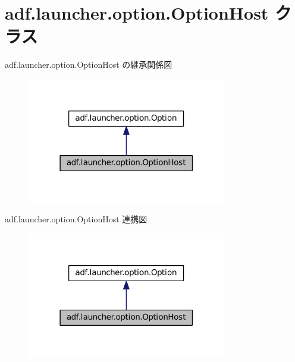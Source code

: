 \hypertarget{classadf_1_1launcher_1_1option_1_1OptionHost}{}\section{adf.\+launcher.\+option.\+Option\+Host クラス}
\label{classadf_1_1launcher_1_1option_1_1OptionHost}


adf.\+launcher.\+option.\+Option\+Host の継承関係図
\nopagebreak
\begin{figure}[H]
\begin{center}
\leavevmode
\includegraphics[width=247pt]{classadf_1_1launcher_1_1option_1_1OptionHost__inherit__graph}
\end{center}
\end{figure}


adf.\+launcher.\+option.\+Option\+Host 連携図
\nopagebreak
\begin{figure}[H]
\begin{center}
\leavevmode
\includegraphics[width=247pt]{classadf_1_1launcher_1_1option_1_1OptionHost__coll__graph}
\end{center}
\end{figure}
